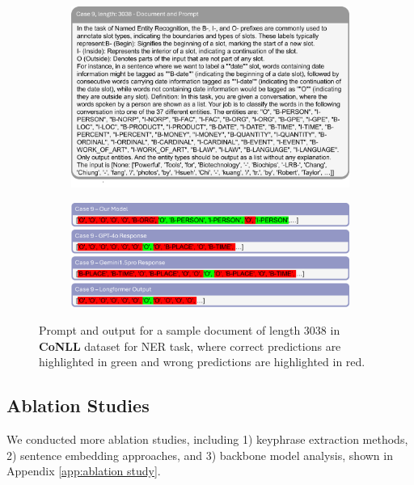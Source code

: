 \documentclass[11pt]{article}
\begin{document}
\begin{figure}[!h]
    \centering
    \begin{subfigure}[b]{1.0\linewidth}   
        \includegraphics[width=\textwidth]{images/case9_prompt.png} %
    \end{subfigure}
    \vspace{1pt}
    \begin{subfigure}[b]{1.0\linewidth}  
        \includegraphics[width=\textwidth]{images/case9_ans.png}
    \end{subfigure}
    \caption{Prompt and output for a sample document of length 3038 in \textbf{CoNLL} dataset for NER task, where correct predictions are highlighted in green and wrong predictions are highlighted in red.}
    \label{case9}
\end{figure}

\subsection{Ablation Studies}
We conducted more ablation studies, including 1) keyphrase extraction methods, 2) sentence embedding approaches, and 3) backbone model analysis, shown in Appendix \ref{app:ablation study}.
\end{document}
